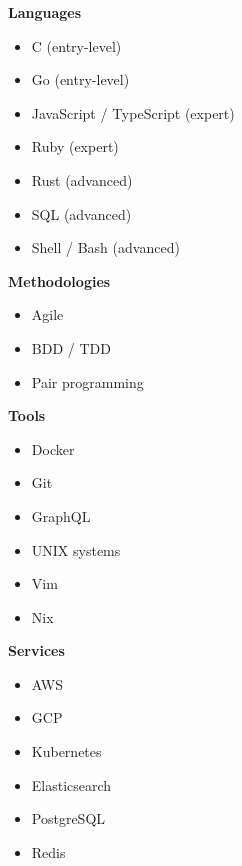 \documentclass[9pt]{developercv} %
\begin{document}
\begin{minipage}[t]{0.3\textwidth} %
  \vspace{-\baselineskip}

  \textbf{Languages}
  \begin{itemize}
      \item C {\footnotesize (entry-level)}
      \item Go {\footnotesize (entry-level)}
      \item JavaScript / TypeScript {\footnotesize (expert)}
      \item Ruby {\footnotesize (expert)}
      \item Rust {\footnotesize (advanced)}
      \item SQL {\footnotesize (advanced)}
      \item Shell / Bash {\footnotesize (advanced)}
  \end{itemize}
\end{minipage}
\hfill
\begin{minipage}[t]{0.3\textwidth}
  \vspace{-\baselineskip}

  \textbf{Methodologies}
  \begin{itemize}
      \item Agile
      \item BDD / TDD
      \item Pair programming
  \end{itemize}

  \textbf{Tools}
  \begin{itemize}
      \item Docker
      \item Git
      \item GraphQL
      \item UNIX systems
      \item Vim
      \item Nix
  \end{itemize}
\end{minipage}
\hfill
\begin{minipage}[t]{0.3\textwidth}
  \vspace{-\baselineskip}

  \textbf{Services}
  \begin{itemize}
      \item AWS
      \item GCP
      \item Kubernetes
      \item Elasticsearch
      \item PostgreSQL
      \item Redis
  \end{itemize}
\end{minipage}

\end{document}
